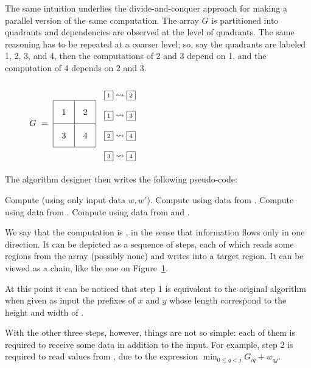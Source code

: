 The same intuition underlies the divide-and-conquer approach for making
a parallel version of the same computation. The array $G$ is partitioned into
quadrants and dependencies are observed at the level of quadrants. The same reasoning
has to be repeated at a coarser level;
so, say the quadrants are labeled 1, 2, 3, and 4, then the computations of 2 and 3 depend on 1,
and the computation of 4 depends on 2 and 3.

\newcommand\qbox[1]{\fbox{\scriptsize#1}}

\begin{figure}[b]
$\renewcommand\arraystretch{2}G ~=~
 \begin{array}{|@{\quad}c@{\quad}|@{\quad}c@{\quad}|} \hline 1 & 2 \\[1mm] \hline 3 & 4 \\[1mm] \hline\end{array}$
\qquad
$\begin{array}{l}\qbox1 \rightsquigarrow \qbox2 \\ 
\qbox1 \rightsquigarrow \qbox3 \\ \qbox2\rightsquigarrow \qbox4 \\ \qbox3 \rightsquigarrow \qbox4\end{array}$
\end{figure}

\medskip
The algorithm designer then writes the following pseudo-code:

\begin{algorithmic}[1]
  \STATE Compute \qbox1 (using only input data $w,w'$).
  \STATE Compute \qbox2 using data from \qbox1.
  \STATE Compute \qbox3 using data from \qbox1.
  \STATE Compute \qbox4 using data from \qbox2 and \qbox3.
\end{algorithmic}

\newcommand\fig{}

We say that the computation is ,
in the sense that information flows only in one direction. It can be depicted as
a sequence of steps, each of which reads some regions from the array (possibly none)
and writes into a target region. It can be viewed as a chain, like the one on
Figure~\fig\ref{intro:chain}.

\begin{figure}
\fig\label{intro:chain}
\caption{}
\end{figure}

At this point it can be noticed that step 1 is equivalent to the original
algorithm when given as input the prefixes of $x$ and $y$ whose length correspond to the
height and width of \qbox1.

With the other three steps, however, things are not so simple:
each of them is required to receive some data in addition to the input.
For example, step 2 is required to read values from \qbox1, due to the expression
$\min_{0\leq q<j} G_{iq}+w_{qj}$. 
